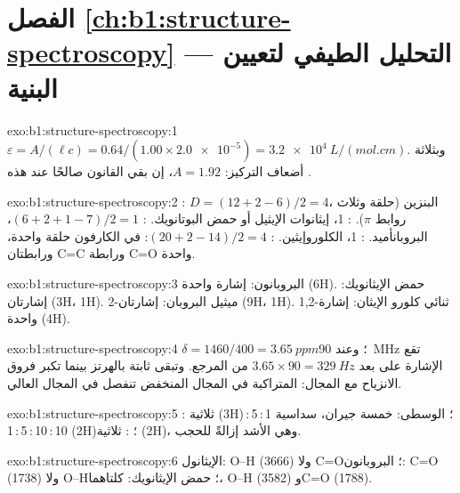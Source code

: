 \section*{الفصل \ref{ch:b1:structure-spectroscopy} --- التحليل الطيفي لتعيين البنية}

\begin{solution}{exo:b1:structure-spectroscopy:1}
$\varepsilon = A/(\ell c) = 0.64/(1.00 \times \num{2.0e-5}) =
\qty{3.2e4}{L/(mol.cm)}$. وبثلاثة أضعاف التركيز: $A = 1.92$، إن
بقي القانون صالحًا عند هذه .
\end{solution}

\begin{solution}{exo:b1:structure-spectroscopy:2}
: $D = (12 + 2 - 6)/2 = 4$، البنزين (حلقة وثلاث روابط $\pi$).
: 1، إيثانوات الإيثيل أو حمض البوتانويك. : $(6 + 2 + 1
- 7)/2 = 1$، البروبانأميد. : 1، الكلوروإيثين. :
$(20 + 2 - 14)/2 = 4$: في الكارفون حلقة واحدة، ورابطتان C=C ورابطة C=O واحدة.
\end{solution}

\begin{solution}{exo:b1:structure-spectroscopy:3}
البروبانون: إشارة واحدة (6H). حمض الإيثانويك: إشارتان (3H، 1H). 2-ميثيل البروبان:
إشارتان (9H، 1H). 1,2-ثنائي كلورو الإيثان: إشارة واحدة (4H).
\end{solution}

\begin{solution}{exo:b1:structure-spectroscopy:4}
$\delta = 1460/400 = \qty{3.65}{ppm}$؛ وعند \qty{90}{MHz} تقع الإشارة
على بعد $3.65 \times 90 = \qty{329}{Hz}$ من المرجع. وتبقى 
ثابتة بالهرتز بينما تكبر فروق الانزياح مع المجال:
 المتراكبة في المجال المنخفض تنفصل في المجال العالي.
\end{solution}

\begin{solution}{exo:b1:structure-spectroscopy:5}
: ثلاثية (3H)؛  الوسطى: خمسة جيران، سداسية
1\,:\,5\,:\,10\,:\,10\,:\,5\,:\,1 (2H)؛ : ثلاثية (2H)، وهي الأشد
إزالةً للحجب.
\end{solution}

\begin{solution}{exo:b1:structure-spectroscopy:6}
الإيثانول: O--H (3666) ولا C=O؛ البروبانون: C=O (1738) ولا O--H؛
حمض الإيثانويك: كلتاهما، O--H (3582) وC=O (1788).
\end{solution}

